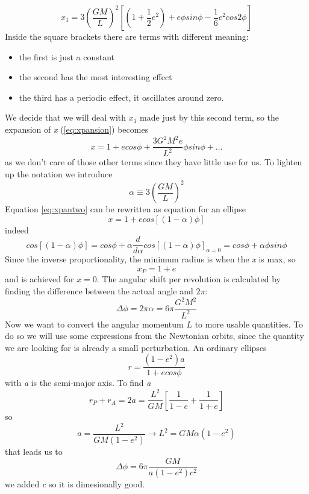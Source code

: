 \begin{equation}
x_{1} = 3 \left( \frac{GM}{L} \right)^{2}  \left[ \left( 1+ \frac{1}{2}e^{2} \right) + e\phi sin\phi - \frac{1}{6}e^{2}cos2\phi  \right]
\end{equation}
Inside the square brackets there are terms with different meaning:
\begin{itemize}
\item the first is just a constant
\item the second has the most interesting effect
\item the third has a periodic effect, it oscillates around zero.
\end{itemize}
We decide that we will deal with $x_{1}$ made just by this second term, so the expansion of \emph{x} (\ref{eq:xpansion}) becomes
\begin{equation}\label{eq:xpantwo}
x = 1 + ecos\phi + \frac{3G^{2}M^{2}e}{L^{2}}\phi sin\phi + \ldots 
\end{equation}
as we don't care of those other terms since they have little use for us. To lighten up the notation we introduce
\[
\alpha \equiv 3 \left( \frac{GM}{L} \right)^{2}
\]
Equation \ref{eq:xpantwo} can be rewritten as equation for an ellipse
\begin{equation}
x = 1 + ecos\left[ \left( 1-\alpha  \right)\phi  \right]
\end{equation}
indeed
\[
cos\left[ \left( 1-\alpha  \right)\phi  \right] = cos\phi  + \alpha \frac{d }{d \alpha }cos\left[ \left( 1-\alpha  \right)\phi  \right]_{\alpha =0} = cos\phi + \alpha \phi sin \phi 
\]
Since the inverse proportionality, the minimum radius is when the \emph{x} is max, so
\[
x_{P} = 1 +e
\]
and is achieved for $x=0$. The angular shift per revolution is calculated by finding the difference between the actual angle and $2\pi $:
\[
\Delta \phi = 2\pi \alpha = 6\pi \frac{G^{2}M^{2}}{L^{2}}
\]
Now we want to convert the angular momentum $L$ to more usable quantities. To do so we will use some expressions from the Newtonian orbits, since the quantity we are looking for is already a small perturbation. An ordinary ellipses
\[
r = \frac{\left( 1-e^{2} \right)a}{1+ecos\phi }
\]
with \emph{a} is the semi-major axis. To find \emph{a}
\[
r_{P} +r_{A} = 2a = \frac{L^{2}}{GM}\left[ \frac{1}{1-e} + \frac{1}{1+e} \right]
\]
so 
\[
a = \frac{L^{2}}{GM \left( 1-e^{2} \right)} \to  L^{2 }= GM\alpha \left( 1-e^{2} \right)
\]
that leads us to
\begin{equation}
\Delta \phi  = 6\pi \frac{GM}{a\left( 1-e^{2} \right)c^{2}}
\end{equation}
we added \emph{c} so it is dimesionally good.

























